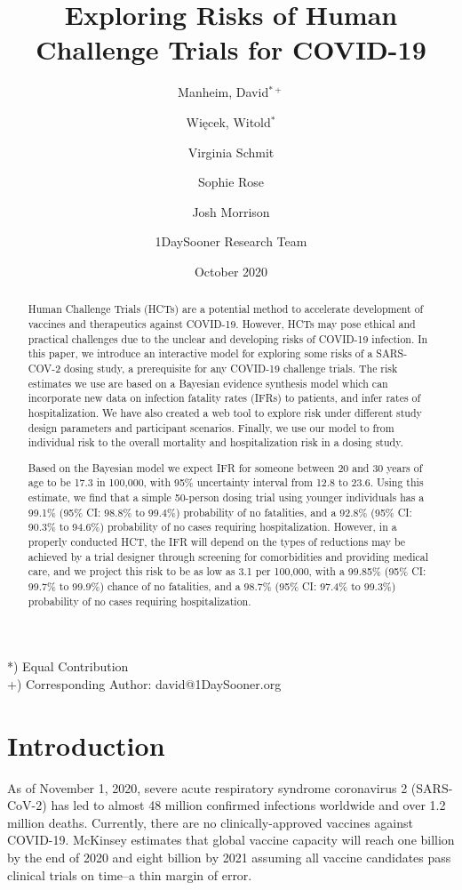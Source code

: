 \documentclass{article}
\title{Exploring Risks of Human Challenge Trials for COVID-19}
\author{Manheim, David$^{*+}$ \and Więcek, Witold$^*$ 
\and Virginia Schmit %
\\ \and Sophie Rose  \and Josh Morrison \and 1DaySooner Research Team}
\date{October 2020}
\begin{document}
\maketitle

\begin{abstract}
   Human Challenge Trials (HCTs) are a potential method to accelerate development of vaccines and therapeutics against COVID-19. However, HCTs may pose ethical and practical challenges due to the unclear and developing risks of COVID-19 infection. In this paper, we introduce an interactive model for exploring some risks of a SARS-COV-2 dosing study, a  prerequisite for any COVID-19 challenge trials. The risk estimates we use are based on a Bayesian evidence synthesis model which can incorporate new data on infection fatality rates (IFRs) to patients, and infer rates of hospitalization. We have also created a web tool to explore risk under different study design parameters and participant scenarios. Finally, we use our model to  from individual risk to the overall mortality and hospitalization risk in a dosing study.
   
   Based on the Bayesian model we expect IFR for someone between 20 and 30 years of age to be 17.3 in 100,000, with 95\% uncertainty interval from 12.8 to 23.6.  Using this estimate, we find that a simple 50-person dosing trial using younger individuals has a 99.1\% (95\% CI: 98.8\% to 99.4\%) probability of no fatalities, and a 92.8\% (95\% CI: 90.3\% to 94.6\%) probability of no cases requiring hospitalization. However, in a properly conducted HCT, the IFR will depend on the types of reductions may be achieved by a trial designer through screening for comorbidities and providing medical care, and we project this risk to be as low as 3.1 per 100,000, with a 99.85\% (95\% CI: 99.7\% to 99.9\%) chance of no fatalities, and a 98.7\% (95\% CI:  97.4\% to 99.3\%) probability of no cases requiring hospitalization.
\end{abstract}

\small{\noindent
*) Equal Contribution\\
+) Corresponding Author: david@1DaySooner.org}

\pagebreak

\section{Introduction}

As of November 1, 2020, severe acute respiratory syndrome coronavirus 2 (SARS-CoV-2) has led to almost 48 million confirmed infections worldwide and over 1.2 million deaths. Currently, there are no clinically-approved vaccines against COVID-19. McKinsey estimates that global vaccine capacity will reach one billion by the end of 2020 and eight billion by 2021 assuming all vaccine candidates pass clinical trials on time\cite{McKinsey2020}--a thin margin of error.
\end{document}
